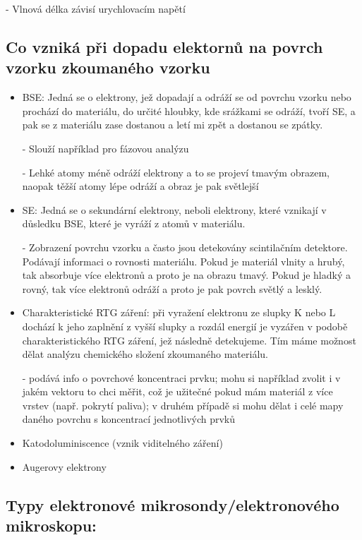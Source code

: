 - Vlnová délka závisí urychlovacím napětí
\\

\subsection{Co vzniká při dopadu elektornů na povrch vzorku zkoumaného vzorku}

\begin{itemize}
    \item BSE: Jedná se o elektrony, jež dopadají a odráží se od povrchu vzorku nebo prochází do materiálu, do určité hloubky, kde srážkami se odráží, tvoří SE, a pak se z materiálu zase dostanou a letí mi zpět a dostanou se zpátky.

    - Slouží například pro fázovou analýzu

    - Lehké atomy méně odráží elektrony a to se projeví tmavým obrazem, naopak těžší atomy lépe odráží a obraz je pak světlejší


    \item  SE: Jedná se o sekundární elektrony, neboli elektrony, které vznikají v důsledku BSE, které je vyráží z atomů v materiálu.

    - Zobrazení povrchu vzorku a často jsou detekovány scintilačním detektore. Podávají informaci o rovnosti materiálu. Pokud je materiál vlnity a hrubý, tak absorbuje více elektronů a proto je na obrazu tmavý. Pokud je hladký a rovný, tak více elektronů odráží a proto je pak povrch světlý a lesklý.

    \item Charakteristické RTG záření: při vyražení elektronu ze slupky K nebo L dochází k jeho zaplnění z vyšší slupky a rozdál energií je vyzářen v podobě charakteristického RTG záření, jež následně detekujeme. Tím máme možnost dělat analýzu chemického složení zkoumaného materiálu.

    - podává info o povrchové koncentraci prvku; mohu si například zvolit i v jakém vektoru to chci měřit, což je užitečné pokud mám materiál z více vrstev (např. pokrytí paliva); v druhém případě si mohu dělat i celé mapy daného povrchu s koncentrací jednotlivých prvků

    \item Katodoluminiscence (vznik viditelného záření)

    \item Augerovy elektrony
\end{itemize}

\subsection{Typy elektronové mikrosondy/elektronového mikroskopu:}

